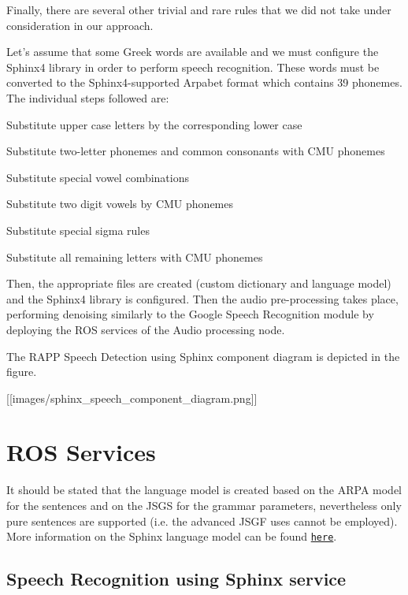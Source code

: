 Finally, there are several other trivial and rare rules that we did not take under consideration in our approach.

Let’s assume that some Greek words are available and we must configure the Sphinx4 library in order to perform speech recognition. These words must be converted to the Sphinx4-\/supported Arpabet format which contains 39 phonemes. The individual steps followed are\-:


\begin{DoxyItemize}
\item Substitute upper case letters by the corresponding lower case
\item Substitute two-\/letter phonemes and common consonants with C\-M\-U phonemes
\item Substitute special vowel combinations
\item Substitute two digit vowels by C\-M\-U phonemes
\item Substitute special sigma rules
\item Substitute all remaining letters with C\-M\-U phonemes
\end{DoxyItemize}

Then, the appropriate files are created (custom dictionary and language model) and the Sphinx4 library is configured. Then the audio pre-\/processing takes place, performing denoising similarly to the Google Speech Recognition module by deploying the R\-O\-S services of the Audio processing node.

The R\-A\-P\-P Speech Detection using Sphinx component diagram is depicted in the figure.

\mbox{[}\mbox{[}images/sphinx\-\_\-speech\-\_\-component\-\_\-diagram.\-png\mbox{]}\mbox{]}

\section*{R\-O\-S Services}

It should be stated that the language model is created based on the A\-R\-P\-A model for the {\ttfamily sentences} and on the J\-S\-G\-S for the {\ttfamily grammar} parameters, nevertheless only pure sentences are supported (i.\-e. the advanced J\-S\-G\-F uses cannot be employed). More information on the Sphinx language model can be found \href{http://cmusphinx.sourceforge.net/wiki/tutoriallm}{\tt here}.

\subsection*{Speech Recognition using Sphinx service}

